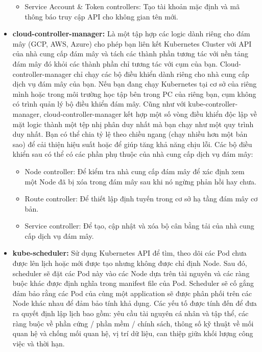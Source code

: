 \documentclass[12pt,a4paper]{report}
\begin{document}
\begin{itemize}
\begin{itemize}
		\item Service Account \& Token controllers: Tạo tài khoản mặc định và mã thông báo truy cập API cho không gian tên mới.
	\end{itemize}

	\item \textbf{cloud-controller-manager:}
	\smallskip
	\subitem
	Là một tập hợp các logic dành riêng cho đám mây (GCP, AWS, Azure) cho phép bạn liên kết Kubernetes Cluster với API của nhà cung cấp đám mây và tách các thành phần tương tác với nền tảng đám mây đó khỏi các thành phần chỉ tương tác với cụm của bạn. Cloud-controller-manager chỉ chạy các bộ điều khiển dành riêng cho nhà cung cấp dịch vụ đám mây của bạn. Nếu bạn đang chạy Kubernetes tại cơ sở của riêng mình hoặc trong môi trường học tập bên trong PC của riêng bạn, cụm không có trình quản lý bộ điều khiển đám mây.
	\smallskip
	\subitem Cũng như với kube-controller-manager, cloud-controller-manager kết hợp một số vòng điều khiển độc lập về mặt logic thành một tệp nhị phân duy nhất mà bạn chạy như một quy trình duy nhất. Bạn có thể chia tỷ lệ theo chiều ngang (chạy nhiều hơn một bản sao) để cải thiện hiệu suất hoặc để giúp tăng khả năng chịu lỗi.
	\smallskip
	\subitem Các bộ điều khiển sau có thể có các phần phụ thuộc của nhà cung cấp dịch vụ đám mây:
	\begin{itemize}
	\item Node controller: Để kiểm tra nhà cung cấp đám mây để xác định xem một Node đã bị xóa trong đám mây sau khi nó ngừng phản hồi hay chưa.
	
	\item Route controller: Để thiết lập định tuyến trong cơ sở hạ tầng đám mây cơ bản.
	
	\item Service controller: Để tạo, cập nhật và xóa bộ cân bằng tải của nhà cung cấp dịch vụ đám mây.
	\end{itemize}
	
	\item \textbf{kube-scheduler:}
	\smallskip
	\subitem
	Sử dụng Kubernetes API để tìm, theo dõi các Pod chưa được lên lịch hoặc mới được tạo nhưng không được chỉ định Node. Sau đó, scheduler sẽ đặt các Pod này vào các Node dựa trên tài nguyên và các ràng buộc khác được định nghĩa trong manifest file của Pod. Scheduler sẽ cố gắng đảm bảo rằng các Pod của cùng một application sẽ được phân phối trên các Node khác nhau để đảm bảo tính khả dụng.
	\smallskip
	\subitem Các yếu tố được tính đến để đưa ra quyết định lập lịch bao gồm: yêu cầu tài nguyên cá nhân và tập thể, các ràng buộc về phần cứng / phần mềm / chính sách, thông số kỹ thuật về mối quan hệ và chống mối quan hệ, vị trí dữ liệu, can thiệp giữa khối lượng công việc và thời hạn.
	\end{itemize}
\end{document}
